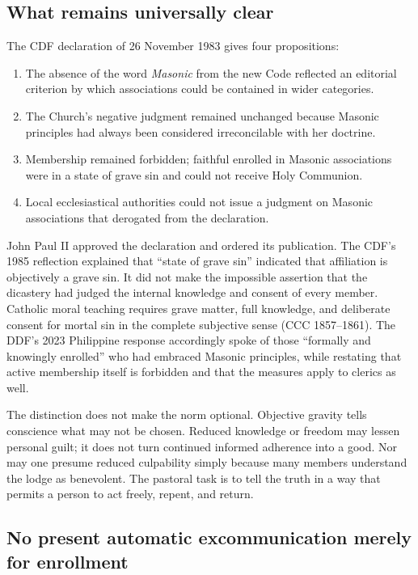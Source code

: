 \subsection{What remains universally clear}

The CDF declaration of 26 November 1983 gives four propositions:

\begin{enumerate}[leftmargin=1.6em,itemsep=0.25em]
\item The absence of the word \emph{Masonic} from the new Code reflected an editorial criterion by which associations could be contained in wider categories.
\item The Church's negative judgment remained unchanged because Masonic principles had always been considered irreconcilable with her doctrine.
\item Membership remained forbidden; faithful enrolled in Masonic associations were in a state of grave sin and could not receive Holy Communion.
\item Local ecclesiastical authorities could not issue a judgment on Masonic associations that derogated from the declaration.
\end{enumerate}

John Paul II approved the declaration and ordered its publication. The CDF's 1985 reflection explained that “state of grave sin” indicated that affiliation is objectively a grave sin. It did not make the impossible assertion that the dicastery had judged the internal knowledge and consent of every member. Catholic moral teaching requires grave matter, full knowledge, and deliberate consent for mortal sin in the complete subjective sense (CCC 1857--1861). The DDF's 2023 Philippine response accordingly spoke of those “formally and knowingly enrolled” who had embraced Masonic principles, while restating that active membership itself is forbidden and that the measures apply to clerics as well.

The distinction does not make the norm optional. Objective gravity tells conscience what may not be chosen. Reduced knowledge or freedom may lessen personal guilt; it does not turn continued informed adherence into a good. Nor may one presume reduced culpability simply because many members understand the lodge as benevolent. The pastoral task is to tell the truth in a way that permits a person to act freely, repent, and return.

\subsection{No present automatic excommunication merely for enrollment}

